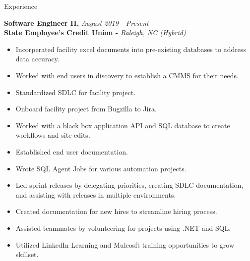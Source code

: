 \documentclass{resume} %
\begin{document}
\begin{rSection}{Experience}

{\bf Software Engineer II, }{\em August 2019 - Present} 
\\
{\bf State Employee's Credit Union -  }{\em Raleigh, NC (Hybrid)}
\begin{itemize}
\item Incorperated facility excel documents into pre-existing databases to address data accuracy.
\item Worked with end users in discovery to establish a CMMS for their needs.
\item Standardized SDLC for facility project.
\item Onboard facility project from Bugzilla to Jira.
\item Worked with a black box application API and SQL database to create workflows and site edits.
\item Established end user documentation.
\item Wrote SQL Agent Jobs for various automation projects.
\item Led sprint releases by delegating priorities, creating SDLC documentation, and assisting with releases in multiple environments.
\item Created documentation for new hires to streamline hiring process.
\item Assisted teammates by volunteering for projects  using .NET and SQL.
\item Utilized LinkedIn Learning and Muleosft training opportunities to grow skillset.
\end{itemize}


\end{rSection}
\end{document}

